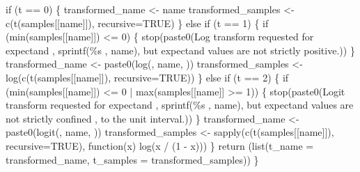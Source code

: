 \documentclass[
  letterpaper,
  DIV=11,
  numbers=noendperiod]{scrartcl}
\newenvironment{Shaded}{\begin{snugshade}}{\end{snugshade}}
\newcommand{\BuiltInTok}[1]{\textcolor[rgb]{0.00,0.23,0.31}{#1}}
\newcommand{\ControlFlowTok}[1]{\textcolor[rgb]{0.00,0.23,0.31}{#1}}
\newcommand{\DecValTok}[1]{\textcolor[rgb]{0.68,0.00,0.00}{#1}}
\newcommand{\NormalTok}[1]{\textcolor[rgb]{0.00,0.23,0.31}{#1}}
\newcommand{\OperatorTok}[1]{\textcolor[rgb]{0.37,0.37,0.37}{#1}}
\newcommand{\SpecialCharTok}[1]{\textcolor[rgb]{0.37,0.37,0.37}{#1}}
\newcommand{\StringTok}[1]{\textcolor[rgb]{0.13,0.47,0.30}{#1}}
\begin{document}
\begin{Shaded}
\begin{Highlighting}[]
  \ControlFlowTok{if}\NormalTok{ (t }\OperatorTok{==} \DecValTok{0}\NormalTok{) \{}
\NormalTok{    transformed\_name }\OperatorTok{\textless{}{-}}\NormalTok{ name}
\NormalTok{    transformed\_samples }\OperatorTok{\textless{}{-}}\NormalTok{ c(t(samples[[name]]), recursive}\OperatorTok{=}\NormalTok{TRUE)}
\NormalTok{  \} }\ControlFlowTok{else} \ControlFlowTok{if}\NormalTok{ (t }\OperatorTok{==} \DecValTok{1}\NormalTok{) \{}
    \ControlFlowTok{if}\NormalTok{ (}\BuiltInTok{min}\NormalTok{(samples[[name]]) }\OperatorTok{\textless{}=} \DecValTok{0}\NormalTok{) \{}
\NormalTok{      stop(paste0(}\StringTok{\textquotesingle{}Log transform requested for expectand \textquotesingle{}}\NormalTok{,}
\NormalTok{                  sprintf(}\StringTok{\textquotesingle{}}\SpecialCharTok{\%s}\StringTok{ \textquotesingle{}}\NormalTok{, name),}
                  \StringTok{\textquotesingle{}but expectand values are not strictly positive.\textquotesingle{}}\NormalTok{))}
\NormalTok{    \}}
\NormalTok{    transformed\_name }\OperatorTok{\textless{}{-}}\NormalTok{ paste0(}\StringTok{\textquotesingle{}log(\textquotesingle{}}\NormalTok{, name, }\StringTok{\textquotesingle{})\textquotesingle{}}\NormalTok{)}
\NormalTok{    transformed\_samples }\OperatorTok{\textless{}{-}}\NormalTok{ log(c(t(samples[[name]]), recursive}\OperatorTok{=}\NormalTok{TRUE))}
\NormalTok{  \} }\ControlFlowTok{else} \ControlFlowTok{if}\NormalTok{ (t }\OperatorTok{==} \DecValTok{2}\NormalTok{) \{}
    \ControlFlowTok{if}\NormalTok{ (}\BuiltInTok{min}\NormalTok{(samples[[name]]) }\OperatorTok{\textless{}=} \DecValTok{0} \OperatorTok{|} \BuiltInTok{max}\NormalTok{(samples[[name]] }\OperatorTok{\textgreater{}=} \DecValTok{1}\NormalTok{)) \{}
\NormalTok{      stop(paste0(}\StringTok{\textquotesingle{}Logit transform requested for expectand \textquotesingle{}}\NormalTok{,}
\NormalTok{                  sprintf(}\StringTok{\textquotesingle{}}\SpecialCharTok{\%s}\StringTok{ \textquotesingle{}}\NormalTok{ , name),}
                  \StringTok{\textquotesingle{}but expectand values are not strictly confined \textquotesingle{}}\NormalTok{,}
                  \StringTok{\textquotesingle{}to the unit interval.\textquotesingle{}}\NormalTok{))}
\NormalTok{    \}}
\NormalTok{    transformed\_name }\OperatorTok{\textless{}{-}}\NormalTok{ paste0(}\StringTok{\textquotesingle{}logit(\textquotesingle{}}\NormalTok{, name, }\StringTok{\textquotesingle{})\textquotesingle{}}\NormalTok{)}
\NormalTok{    transformed\_samples }\OperatorTok{\textless{}{-}}\NormalTok{ sapply(c(t(samples[[name]]), recursive}\OperatorTok{=}\NormalTok{TRUE), }
\NormalTok{                                  function(x) log(x }\OperatorTok{/}\NormalTok{ (}\DecValTok{1} \OperatorTok{{-}}\NormalTok{ x)))}
\NormalTok{  \}}
  \ControlFlowTok{return}\NormalTok{ (}\BuiltInTok{list}\NormalTok{(}\StringTok{\textquotesingle{}t\_name\textquotesingle{}} \OperatorTok{=}\NormalTok{ transformed\_name, }
               \StringTok{\textquotesingle{}t\_samples\textquotesingle{}} \OperatorTok{=}\NormalTok{ transformed\_samples))}
\NormalTok{\}}
\end{Highlighting}
\end{Shaded}
\end{document}
